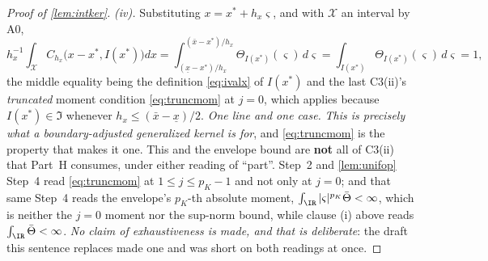 \begin{proof}[Proof of \cref{lem:intker}]
\emph{(iv).} Substituting $x=x^\ast+h_x\varsigma$, and with $\mathcal X$ an interval by A0,
\[
h_x^{-1}\!\int_{\mathcal X}C_{h_x}\big(x-x^\ast,I(x^\ast)\big)dx
=\int_{(\underline x-x^\ast)/h_x}^{(\bar x-x^\ast)/h_x}\Theta_{I(x^\ast)}(\varsigma)\,d\varsigma
=\int_{I(x^\ast)}\Theta_{I(x^\ast)}(\varsigma)\,d\varsigma
=1 ,
\]
the middle equality being the definition \eqref{eq:ivalx} of $I(x^\ast)$ and the last
C3(ii)'s \emph{truncated} moment condition \eqref{eq:truncmom} at $j=0$, which applies because
$I(x^\ast)\in\mathfrak I$ whenever $h_x\le(\bar x-\underline x)/2$. \emph{One line and one case.}
\emph{This is precisely what a boundary-adjusted generalized kernel is for}, and \eqref{eq:truncmom}
is the property that makes it one.
This and the envelope bound are \textbf{not} all of C3(ii) that Part~H consumes, under either
reading of ``part''.  Step~2 and \cref{lem:unifop} Step~4 read \eqref{eq:truncmom} at
$1\le j\le p_K-1$ and not only at $j=0$; and that same Step~4 reads the envelope's $p_K$-th absolute
moment, $\int_\IR|\varsigma|^{p_K}\bar\Theta<\infty$, which is neither the $j=0$ moment nor the
sup-norm bound, while clause \textup{(i)} above reads $\int_\IR\bar\Theta<\infty$. \emph{No claim of
exhaustiveness is made, and that is deliberate}: the draft this sentence replaces made one and was
short on both readings at once.
\end{proof}

